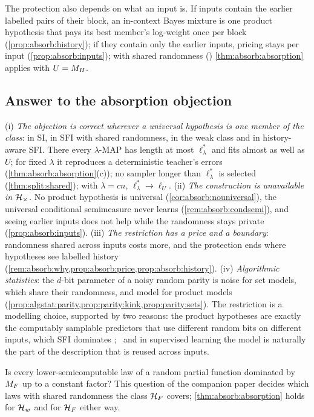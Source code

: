 The protection also depends on what an input is. If inputs contain the earlier labelled pairs of their block, an in-context Bayes mixture is one product hypothesis that pays its best member's log-weight once per block (\cref{prop:absorb:history}); if they contain only the earlier inputs, pricing stays per input (\cref{prop:absorb:inputs}); with shared randomness (\SFIhist{}) \cref{thm:absorb:absorption} applies with $U=M_{H}$.

\subsection{Answer to the absorption objection}\label{sec:absorb:answer}

\begin{remark}\label{rem:absorb:wyeth}
(i) \emph{The objection is correct wherever a universal hypothesis is one member of the class}: in SI, in SFI with shared randomness, in the weak class and in history-aware SFI. There every $\lambda$-MAP has length at most $\ell^*_\lambda$ and fits almost as well as $U$; for fixed $\lambda$ it reproduces a deterministic teacher's errors (\cref{thm:absorb:absorption}(c)); no sampler longer than $\ell^*_\lambda$ is selected (\cref{thm:split:shared}); with $\lambda=cn$, $\ell^*_\lambda\to\ell_U$. (ii) \emph{The construction is unavailable in $\mathcal{H}_{\times}$.} No product hypothesis is universal (\cref{cor:absorb:nouniversal}), the universal conditional semimeasure never learns (\cref{rem:absorb:condsemi}), and seeing earlier inputs does not help while the randomness stays private (\cref{prop:absorb:inputs}). (iii) \emph{The restriction has a price and a boundary}: randomness shared across inputs costs more, and the protection ends where hypotheses see labelled history (\cref{rem:absorb:why,prop:absorb:price,prop:absorb:history}). (iv) \emph{Algorithmic statistics}: the $d$-bit parameter of a noisy random parity is noise for set models, which share their randomness, and model for product models (\cref{prop:algstat:parity,prop:parity:kink,prop:parity:sets}).
The restriction is a modelling choice, supported by two reasons: the product hypotheses are exactly the computably samplable predictors that use different random bits on different inputs, which SFI dominates \citep[Theorem~5.1(a)]{claudeSFI2026fundamentals};%
\ and in supervised learning the model is naturally the part of the description that is reused across inputs.
\end{remark}

\begin{question}\label{q:absorb:shared}
Is every lower-semicomputable law of a random partial function dominated by $M_{F}$ up to a constant factor? This question of the companion paper \citep[Question~3.14]{claudeSFI2026fundamentals} %
decides which laws with shared randomness the class $\mathcal{H}_{F}$ covers; \cref{thm:absorb:absorption} holds for $\mathcal{H}_{w}$ and for $\mathcal{H}_{F}$ either way.
\end{question}
